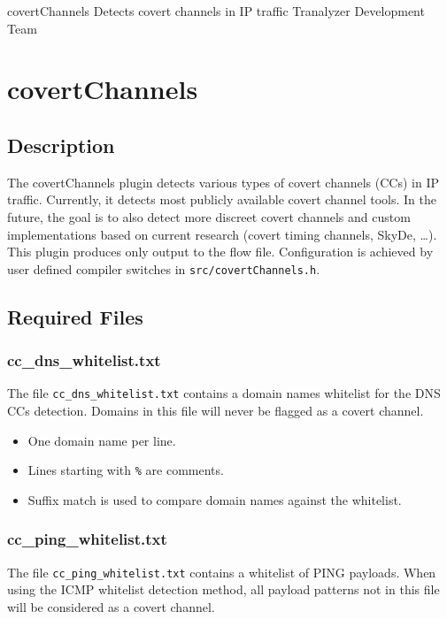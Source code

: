 \documentclass[documentation]{subfiles}
\begin{document}
\trantitle
    {covertChannels}
    {Detects covert channels in IP traffic}
    {Tranalyzer Development Team} %

\section{covertChannels}
\label{s:covertChannels}

\subsection{Description}
The covertChannels plugin detects various types of covert channels (CCs) in IP traffic. Currently, it
detects most publicly available covert channel tools. In the future, the goal is to also
detect more discreet covert channels and custom implementations based on current research
(covert timing channels, SkyDe, \ldots). This plugin produces only output to the flow file.
Configuration is achieved by user defined compiler switches in {\tt src/covertChannels.h}.

\subsection{Required Files}

\subsubsection{cc\_dns\_whitelist.txt}

The file {\tt cc\_dns\_whitelist.txt} contains a domain names whitelist for the DNS CCs detection.
Domains in this file will never be flagged as a covert channel.

\begin{itemize}
    \itemsep0em
    \item One domain name per line.
    \item Lines starting with {\tt \%} are comments.
    \item Suffix match is used to compare domain names against the whitelist.
\end{itemize}

\subsubsection{cc\_ping\_whitelist.txt}

The file {\tt cc\_ping\_whitelist.txt} contains a whitelist of PING payloads.
When using the ICMP whitelist detection method, all payload patterns not in this file will be considered
as a covert channel.
\end{document}
